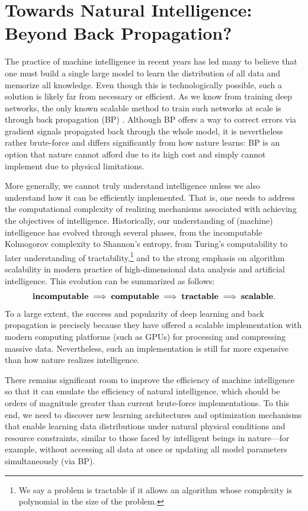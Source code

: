 \documentclass[../../book-main.tex]{subfiles}
\begin{document}
\section{Towards Natural Intelligence: Beyond Back Propagation?}
The practice of machine intelligence in recent years has led many to
believe that one must build a single large model to learn the
distribution of all data and memorize all knowledge. Even though this
is technologically possible, such a solution is likely far from
necessary or efficient. As we know from training deep networks, the
only known scalable method to train such networks at scale is through
back propagation (BP) \citep{Back-Prop}. Although BP offers a way to
correct errors via gradient signals propagated back through the whole
model, it is nevertheless rather brute-force and differs
significantly from how nature learns: BP is an option that nature
cannot afford due to its high cost and simply cannot implement due to
physical limitations.

More generally, we cannot truly understand intelligence unless we
also understand how it can be efficiently implemented. That is, one
needs to address the computational complexity of realizing mechanisms
associated with achieving the objectives of intelligence.
Historically, our understanding of (machine) intelligence has evolved
through several phases, from the incomputable Kolmogorov complexity
to Shannon's entropy, from Turing's computability to later
understanding of tractability,\footnote{We say a problem is tractable
    if it allows an algorithm whose complexity is polynomial in the size
of the problem.} and to the strong emphasis on algorithm scalability
in modern practice of high-dimensional data analysis
\citep{Wright-Ma-2022} and artificial intelligence. This evolution can
be summarized as follows:
\begin{equation}
    \text{\textbf{incomputable}} \;
    \Longrightarrow \; \text{\textbf{computable}} \;
    \Longrightarrow \; \text{\textbf{tractable}} \; \Longrightarrow \;
    \text{\textbf{scalable}}.
\end{equation}
To a large extent, the success and popularity of deep learning and
back propagation is precisely because they have offered a scalable
implementation with modern computing platforms (such as GPUs) for
processing and compressing massive data. Nevertheless, such an
implementation is still far more expensive than how nature realizes
intelligence.

There remains significant room to improve the efficiency of machine
intelligence so that it can emulate the efficiency of natural
intelligence, which should be orders of magnitude greater than
current brute-force implementations. To this end, we need to discover
new learning architectures and optimization mechanisms that enable
learning data distributions under natural physical conditions and
resource constraints, similar to those faced by intelligent beings in
nature---for example, without accessing all data at once or updating
all model parameters simultaneously (via BP).
\end{document}
